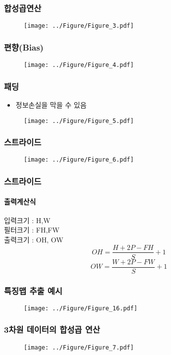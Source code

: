\documentclass{beamer}
\begin{document}
\begin{frame}
	\frametitle{합성곱연산}
	\begin{figure}
		\texttt{[image: ../Figure/Figure\_3.pdf]}
	\end{figure}
\end{frame}

\begin{frame}
	\frametitle{편향(Bias)}
	\begin{figure}
		\texttt{[image: ../Figure/Figure\_4.pdf]}
	\end{figure}
\end{frame}
\begin{frame}
	\frametitle{패딩}
	\begin{itemize}
		\item 정보손실을 막을 수 있음
	\end{itemize}
	\begin{figure}
		\texttt{[image: ../Figure/Figure\_5.pdf]}
	\end{figure}
\end{frame}

\begin{frame}
	\frametitle{스트라이드}
	\begin{figure}
		\texttt{[image: ../Figure/Figure\_6.pdf]}
	\end{figure}
\end{frame}

\begin{frame}
	\frametitle{스트라이드}
	\framesubtitle{출력계산식}
	입력크기 : H,W\\
	필터크기 : FH,FW\\
	출력크기 : OH, OW\\
	$$ OH = \dfrac{H+2P-FH}{S} + 1 $$
	$$ OW = \dfrac{W+2P-FW}{S} + 1 $$
\end{frame}

\begin{frame}
	\frametitle{특징맵 추출 예시}
	\begin{figure}
		\texttt{[image: ../Figure/Figure\_16.pdf]}
	\end{figure}
\end{frame}

\begin{frame}
	\frametitle{3차원 데이터의 합성곱 연산}
	\begin{figure}
		\texttt{[image: ../Figure/Figure\_7.pdf]}
	\end{figure}
\end{frame}
\end{document}
